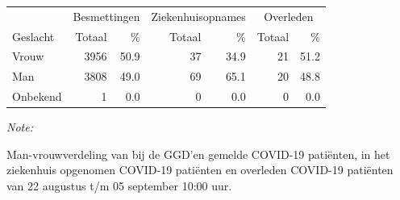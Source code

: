 \documentclass[
  english,
  man,floatsintext]{apa6}
\begin{document}
\begin{table}[H]
\centering\begingroup\fontsize{11}{13}\selectfont

\begin{threeparttable}
\begin{tabular}{lrrrrrr}
\toprule
\multicolumn{1}{c}{ } & \multicolumn{2}{c}{Besmettingen} & \multicolumn{2}{c}{Ziekenhuisopnames} & \multicolumn{2}{c}{Overleden} \\
\cmidrule(l{3pt}r{3pt}){2-3} \cmidrule(l{3pt}r{3pt}){4-5} \cmidrule(l{3pt}r{3pt}){6-7}
Geslacht & Totaal & \% & Totaal & \% & Totaal & \%\\
\midrule
Vrouw & 3956 & 50.9 & 37 & 34.9 & 21 & 51.2\\
Man & 3808 & 49.0 & 69 & 65.1 & 20 & 48.8\\
Onbekend & 1 & 0.0 & 0 & 0.0 & 0 & 0.0\\
\bottomrule
\end{tabular}
\begin{tablenotes}
\item \textit{Note: } 
\item Man-vrouwverdeling van bij de GGD’en gemelde COVID-19 patiënten, in het ziekenhuis opgenomen COVID-19 patiënten en overleden COVID-19 patiënten van 22 augustus t/m 05 september 10:00 uur.
\end{tablenotes}
\end{threeparttable}
\endgroup{}
\end{table}
\newpage
\end{document}
